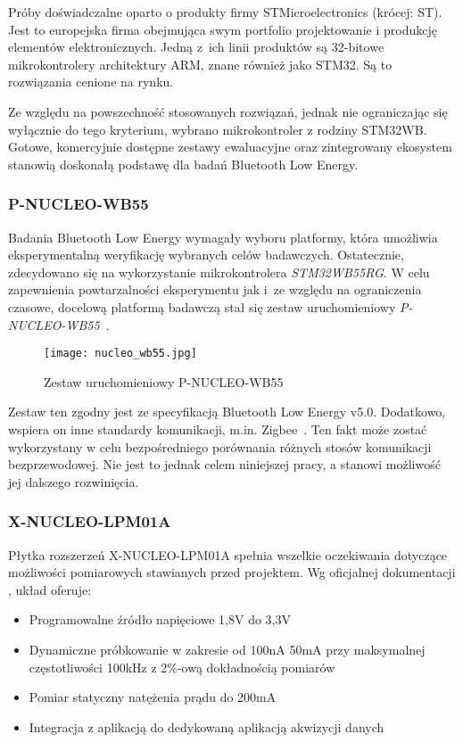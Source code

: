 Próby doświadczalne oparto o produkty firmy STMicroelectronics (krócej: ST). Jest to europejska firma
obejmująca swym portfolio projektowanie i produkcję elementów elektronicznych. Jedną
z~ich linii produktów są 32-bitowe mikrokontrolery architektury ARM, znane również jako STM32.
Są to rozwiązania cenione na rynku.

Ze względu na powszechność stosowanych rozwiązań, jednak nie ograniczając się wyłącznie do tego kryterium,
wybrano mikrokontroler z rodziny STM32WB. Gotowe, komercyjnie dostępne zestawy ewaluacyjne oraz
zintegrowany ekosystem stanowią doskonałą podstawę dla badań Bluetooth Low Energy.


\subsubsection{P-NUCLEO-WB55}

Badania Bluetooth Low Energy wymagały wyboru platformy, która umożliwia eksperymentalną 
weryfikację wybranych celów badawczych. Ostatecznie, zdecydowano się na wykorzystanie 
mikrokontrolera \textit{STM32WB55RG}. W celu zapewnienia powtarzalności eksperymentu jak 
i~ze względu na ograniczenia czasowe, docelową platformą badawczą stał się zestaw 
uruchomieniowy \textit{P-NUCLEO-WB55}~\cite{noauthor_p-nucleo-wb55_nodate}.

\begin{figure}[!htb]
	\centering \texttt{[image: nucleo\_wb55.jpg]}
	\caption{Zestaw uruchomieniowy P-NUCLEO-WB55}
	\label{rys:nucleo_wb55}
\end{figure}

Zestaw ten zgodny jest ze specyfikacją Bluetooth Low Energy v5.0. Dodatkowo, wspiera
on inne standardy komunikacji, m.in. Zigbee~\cite{noauthor_stm32wb_2022}.
Ten fakt może zostać wykorzystany w celu bezpośredniego porównania różnych stosów komunikacji bezprzewodowej.
Nie jest to jednak celem niniejszej pracy, a stanowi możliwość jej dalszego 
rozwinięcia.


\subsubsection{X-NUCLEO-LPM01A} \label{device:plytka_pomiarowa}

Płytka rozszerzeń X-NUCLEO-LPM01A spełnia wszelkie oczekiwania dotyczące możliwości pomiarowych
stawianych przed projektem. Wg oficjalnej dokumentacji \cite{noauthor_um2243_2018}, układ oferuje:

\begin{itemize}
\item Programowalne źródło napięciowe 1,8V do 3,3V
\item Dynamiczne próbkowanie w zakresie od 100nA 50mA przy maksymalnej częstotliwości 100kHz z 2\%-ową dokładnością pomiarów
\item Pomiar statyczny natężenia prądu do 200mA
\item Integracja z aplikacją do dedykowaną aplikacją akwizycji danych \cite{noauthor_stm32cubemonpwr_2022}
\end{itemize}


